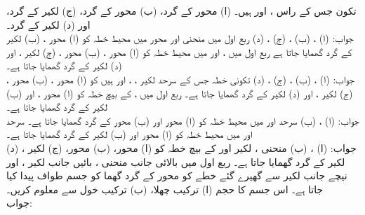 تکون جس کے راس ،  اور  ہیں۔ (ا)  محور کے گرد، (ب)  محور کے گرد، (ج) لکیر  کے گرد، اور (د) لکیر  کے گرد۔\\
جواب:\quad
(ا) ، (ب) ، (ج) ، (د) 
ربع اول میں منحنی  اور  محور میں محیط خطہ کو (ا) محور ، (ب) لکیر  کے گرد گھمایا جاتا ہے 
ربع اول میں ،  اور  میں محیط خطہ کو (ا) محور ، (ب) محور ، (ج) لکیر ، اور (د) لکیر  کے گرد گھمایا جاتا ہے۔\\
جواب:\quad
(ا) ، (ب) ، (ج) ، (د) 
تکونی خطہ جس کے سرحد لکیر ، ، اور  ہیں کو (ا) محور ، (ب) محور ، (ج) لکیر ، اور (د) لکیر  کے گرد گھمایا جاتا ہے۔
ربع اول میں ،  کے بیچ خطہ کو (ا) محور ، اور (ب) لکیر  کے گرد گھمایا جاتا ہے۔\\
جواب:\quad
(ا) ، (ب) 
سرحد  اور  میں محیط خطہ کو (ا) محور  اور (ب) محور  کے گرد گھمایا جاتا ہے۔
سرحد  اور  میں محیط خطہ کو (ا) محور  اور (ب) لکیر  کے گرد گھمایا جاتا ہے۔\\
جواب:\quad
(ا) ، (ب) 
منحنی ، لکیر  اور  کے بیچ خطہ کو (ا)  محور، (ب)  محور، (ج) لکیر ، (د) لکیر  کے گرد گھمایا جاتا ہے۔
ربع اول میں بالائی جانب منحنی ، بائیں جانب لکیر ، اور نیچے جانب لکیر  سے گھیرے گئے خطے کو  محور کے گرد گھما کو جسم طواف پیدا کیا جاتا ہے۔ اس جسم کا حجم (ا) ترکیب چھلا، (ب) ترکیب خول سے معلوم کریں۔\\
جواب:\quad
{}
